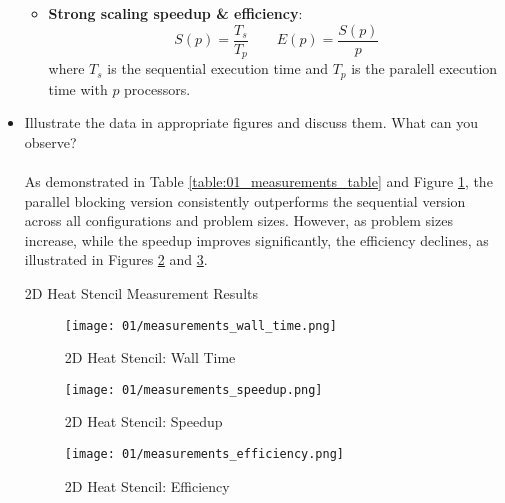 \documentclass[UTF-8]{article}
\begin{document}
\begin{itemize}
\begin{itemize}
\begin{itemize}
                \end{itemize}
                \item \textbf{Strong scaling speedup \& efficiency}:\\
                \[
                    S(p) = \frac{T_s}{T_p} \quad\quad E(p) = \frac{S(p)}{p}
                \]
                where $T_s$ is the sequential execution time and $T_p$ is the paralell execution time with $p$ processors.
            \end{itemize}
            \newpage
    	\item Illustrate the data in appropriate figures and discuss them. What can you observe?\\\\
            As demonstrated in Table \ref{table:01_measurements_table} and Figure \ref{fig:01_measurements_wall_time}, the parallel blocking version consistently outperforms the sequential version across all configurations and problem sizes. However, as problem sizes increase, while the speedup improves significantly, the efficiency declines, as illustrated in Figures \ref{fig:01_measurements_speedup} and \ref{fig:01_measurements_efficiency}.

            \begin{table}[H]
                
                \caption{2D Heat Stencil Measurement Results}
                \label{table:01_measurements_table}
            \end{table}
            \begin{figure}[H]
                \centering
                \texttt{[image: 01/measurements\_wall\_time.png]}
                \caption{2D Heat Stencil: Wall Time}
                \label{fig:01_measurements_wall_time}
            \end{figure}
            \begin{figure}[H]
                \centering
                \texttt{[image: 01/measurements\_speedup.png]}
                \caption{2D Heat Stencil: Speedup}
                \label{fig:01_measurements_speedup}
            \end{figure}
            \begin{figure}[H]
                \centering
                \texttt{[image: 01/measurements\_efficiency.png]}
                \caption{2D Heat Stencil: Efficiency}
                \label{fig:01_measurements_efficiency}
            \end{figure}
            


\end{itemize}
\end{document}
